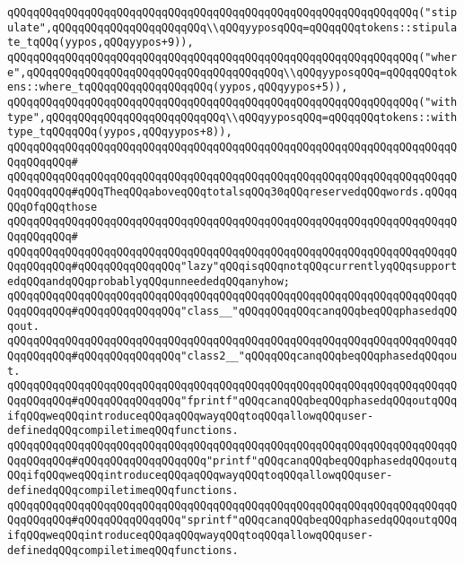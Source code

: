 \verb|qQQqqQQqqQQqqQQqqQQqqQQqqQQqqQQqqQQqqQQqqQQqqQQqqQQqqQQqqQQqqQQq("stipulate",qQQqqQQqqQQqqQQqqQQqqQQq\\qQQqyyposqQQq=qQQqqQQqtokens::stipulate_tqQQq(yypos,qQQqyypos+9)),|\newline
\verb|qQQqqQQqqQQqqQQqqQQqqQQqqQQqqQQqqQQqqQQqqQQqqQQqqQQqqQQqqQQqqQQq("where",qQQqqQQqqQQqqQQqqQQqqQQqqQQqqQQqqQQqqQQq\\qQQqyyposqQQq=qQQqqQQqtokens::where_tqQQqqQQqqQQqqQQqqQQq(yypos,qQQqyypos+5)),|\newline
\verb|qQQqqQQqqQQqqQQqqQQqqQQqqQQqqQQqqQQqqQQqqQQqqQQqqQQqqQQqqQQqqQQq("withtype",qQQqqQQqqQQqqQQqqQQqqQQqqQQq\\qQQqyyposqQQq=qQQqqQQqtokens::withtype_tqQQqqQQq(yypos,qQQqyypos+8)),|\newline
\verb|qQQqqQQqqQQqqQQqqQQqqQQqqQQqqQQqqQQqqQQqqQQqqQQqqQQqqQQqqQQqqQQqqQQqqQQqqQQqqQQq#|\newline
\verb|qQQqqQQqqQQqqQQqqQQqqQQqqQQqqQQqqQQqqQQqqQQqqQQqqQQqqQQqqQQqqQQqqQQqqQQqqQQqqQQq#qQQqTheqQQqaboveqQQqtotalsqQQq30qQQqreservedqQQqwords.qQQqqQQqOfqQQqthose|\newline
\verb|qQQqqQQqqQQqqQQqqQQqqQQqqQQqqQQqqQQqqQQqqQQqqQQqqQQqqQQqqQQqqQQqqQQqqQQqqQQqqQQq#|\newline
\verb|qQQqqQQqqQQqqQQqqQQqqQQqqQQqqQQqqQQqqQQqqQQqqQQqqQQqqQQqqQQqqQQqqQQqqQQqqQQqqQQq#qQQqqQQqqQQqqQQq"lazy"qQQqisqQQqnotqQQqcurrentlyqQQqsupportedqQQqandqQQqprobablyqQQqunneededqQQqanyhow;|\newline
\verb|qQQqqQQqqQQqqQQqqQQqqQQqqQQqqQQqqQQqqQQqqQQqqQQqqQQqqQQqqQQqqQQqqQQqqQQqqQQqqQQq#qQQqqQQqqQQqqQQq"class__"qQQqqQQqqQQqcanqQQqbeqQQqphasedqQQqout.|\newline
\verb|qQQqqQQqqQQqqQQqqQQqqQQqqQQqqQQqqQQqqQQqqQQqqQQqqQQqqQQqqQQqqQQqqQQqqQQqqQQqqQQq#qQQqqQQqqQQqqQQq"class2__"qQQqqQQqcanqQQqbeqQQqphasedqQQqout.|\newline
\verb|qQQqqQQqqQQqqQQqqQQqqQQqqQQqqQQqqQQqqQQqqQQqqQQqqQQqqQQqqQQqqQQqqQQqqQQqqQQqqQQq#qQQqqQQqqQQqqQQq"fprintf"qQQqcanqQQqbeqQQqphasedqQQqoutqQQqifqQQqweqQQqintroduceqQQqaqQQqwayqQQqtoqQQqallowqQQquser-definedqQQqcompiletimeqQQqfunctions.|\newline
\verb|qQQqqQQqqQQqqQQqqQQqqQQqqQQqqQQqqQQqqQQqqQQqqQQqqQQqqQQqqQQqqQQqqQQqqQQqqQQqqQQq#qQQqqQQqqQQqqQQqqQQq"printf"qQQqcanqQQqbeqQQqphasedqQQqoutqQQqifqQQqweqQQqintroduceqQQqaqQQqwayqQQqtoqQQqallowqQQquser-definedqQQqcompiletimeqQQqfunctions.|\newline
\verb|qQQqqQQqqQQqqQQqqQQqqQQqqQQqqQQqqQQqqQQqqQQqqQQqqQQqqQQqqQQqqQQqqQQqqQQqqQQqqQQq#qQQqqQQqqQQqqQQq"sprintf"qQQqcanqQQqbeqQQqphasedqQQqoutqQQqifqQQqweqQQqintroduceqQQqaqQQqwayqQQqtoqQQqallowqQQquser-definedqQQqcompiletimeqQQqfunctions.|\newline
